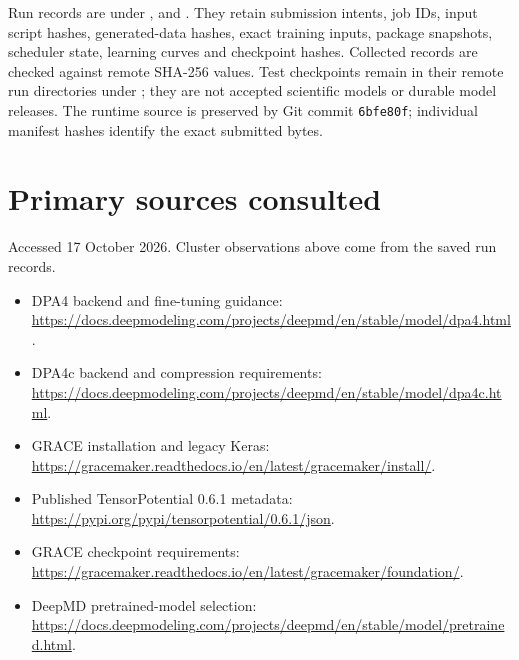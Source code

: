 \documentclass[10pt,a4paper]{article}
\begin{document}
Run records are under ,
 and
.
They retain submission intents, job IDs, input script hashes, generated-data
hashes, exact training inputs, package snapshots, scheduler state, learning
curves and checkpoint hashes. Collected records are checked against remote
SHA-256 values. Test checkpoints remain in their remote run directories under
; they are not accepted scientific models
or durable model releases. The runtime source is preserved by Git commit
\texttt{6bfe80f}; individual manifest hashes identify the exact submitted bytes.

\section{Primary sources consulted}
Accessed 17 October 2026. Cluster observations above come from the saved run records.
\begin{itemize}
\item DPA4 backend and fine-tuning guidance:
\url{https://docs.deepmodeling.com/projects/deepmd/en/stable/model/dpa4.html}.
\item DPA4c backend and compression requirements:
\url{https://docs.deepmodeling.com/projects/deepmd/en/stable/model/dpa4c.html}.
\item GRACE installation and legacy Keras:
\url{https://gracemaker.readthedocs.io/en/latest/gracemaker/install/}.
\item Published TensorPotential 0.6.1 metadata:
\url{https://pypi.org/pypi/tensorpotential/0.6.1/json}.
\item GRACE checkpoint requirements:
\url{https://gracemaker.readthedocs.io/en/latest/gracemaker/foundation/}.
\item DeepMD pretrained-model selection:
\url{https://docs.deepmodeling.com/projects/deepmd/en/stable/model/pretrained.html}.
\end{itemize}
\end{document}
